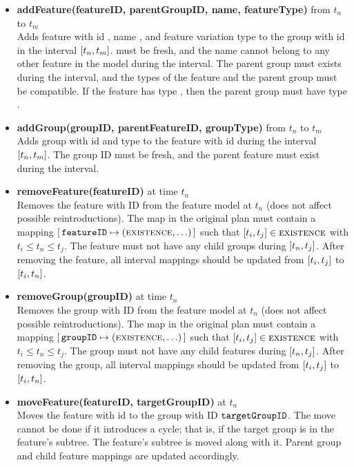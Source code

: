 \begin{itemize}
  \item \textbf{addFeature(featureID, parentGroupID, name, featureType)} from $t_n$ to $t_m$\\
    Adds feature with id , name , and feature variation type  to the group with id  in the interval $\interval{t_n}{t_m}$.  must be fresh, and the name cannot belong to any other feature in the model during the interval. The parent group must exists during the interval, and the types of the feature and the parent group must be compatible. If the feature has type \mandatory{}, then the parent group must have type \andtype{}.
  \item \textbf{addGroup(groupID, parentFeatureID, groupType)} from $t_n$ to $t_m$\\
    Adds group with id  and type  to the feature with id  during the interval $\interval{t_n}{t_m}$. The group ID must be fresh, and the parent feature must exist during the interval. 
  \item \textbf{removeFeature(featureID)} at time $t_n$\\
    Removes the feature with ID  from the feature model at $t_n$ (does not affect possible reintroductions). The \features{} map in the original plan must contain a mapping $[ \,\texttt{featureID} \mapsto (\textsc{existence}, \ldots)\, ]$ such that $\interval{t_i}{t_j} \in \map{existence}$ with $ t_i \leq t_n \leq t_j$. The feature must not have any child groups during $\interval{t_n}{t_j}$. After removing the feature, all interval mappings should be updated from $\interval{t_i}{t_j}$ to $\interval{t_i}{t_n}$.
  \item \textbf{removeGroup(groupID)} at time $t_n$\\
    Removes the group with ID  from the feature model at $t_n$ (does not affect possible reintroductions). The \groups{} map in the original plan must contain a mapping $[ \,\texttt{groupID} \mapsto (\textsc{existence}, \ldots)\, ]$ such that $\interval{t_i}{t_j} \in \map{existence}$ with $t_i \leq t_n \leq t_j$. The group must not have any child features during $\interval{t_n}{t_j}$. After removing the group, all interval mappings should be updated from $\interval{t_i}{t_j}$ to $\interval{t_i}{t_n}$. 
  \item \textbf{moveFeature(featureID, targetGroupID)} at $t_n$\\
    Moves the feature with id  to the group with ID $\texttt{targetGroupID}$. The move cannot be done if it introduces a cycle; that is, if the target group is in the feature's subtree. The feature's subtree is moved along with it. Parent group and child feature mappings are updated accordingly. 

\end{itemize}
